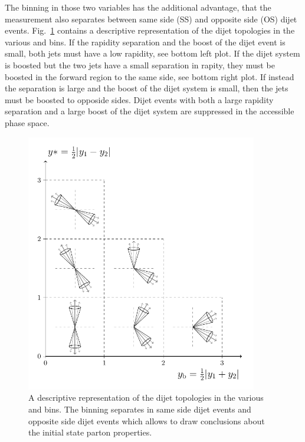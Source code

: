 The binning in those two variables has the additional advantage, that the
measurement also separates between same side (SS) and opposite side (OS) dijet
events. Fig.~\ref{fig:ysyb_schema} contains a descriptive representation of the
dijet topologies in the various \ystar and \yboost bins. If the rapidity
separation and the boost of the dijet event is small, both jets must have a low
rapidity, see bottom left plot. If the dijet system is boosted but the two jets
have a small separation in rapity, they must be boosted in the forward region to
the same side, see bottom right plot. If instead the separation is large and the
boost of the dijet system is small, then the jets must be boosted to opposide
sides. Dijet events with both a large rapidity separation and a large boost of
the dijet system are suppressed in the accessible phase space.

\begin{figure}[htbp]
    \centering
    \includegraphics[width=0.9\textwidth]{figures/measurement/ybys.pdf}
    \caption{A descriptive representation of the dijet topologies in the various
    \ystar and \yboost bins. The binning separates in same side dijet
    events and opposite side dijet events which allows to draw conclusions about
    the initial state parton properties.}
    \label{fig:ysyb_schema}
\end{figure}

